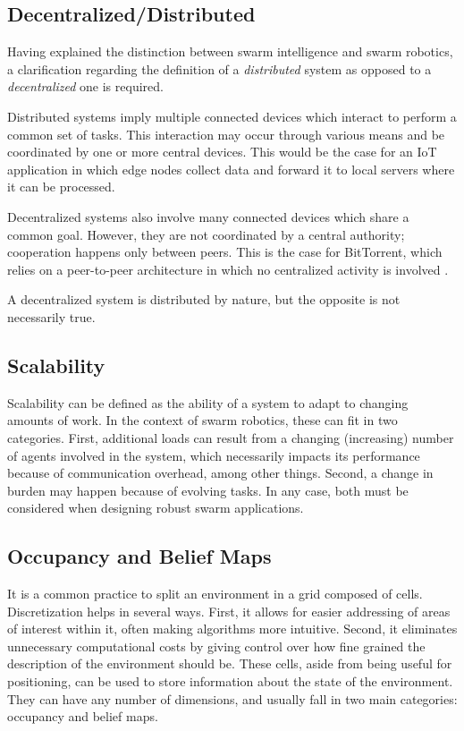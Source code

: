 \subsection{Decentralized/Distributed}
Having explained the distinction between swarm intelligence and swarm robotics, a clarification regarding the definition of a \textit{distributed} system as opposed to a \textit{decentralized} one is required.

Distributed systems imply multiple connected devices which interact to perform a common set of tasks. This interaction may occur through various means and be coordinated by one or more central devices. This would be the case for an \ac{IoT} application in which edge nodes collect data and forward it to local servers where it can be processed.

Decentralized systems also involve many connected devices which share a common goal. However, they are not coordinated by a central authority; cooperation happens only between peers. This is the case for BitTorrent, which relies on a peer-to-peer architecture in which no centralized activity is involved \cite{zhang2010unraveling}.

A decentralized system is distributed by nature, but the opposite is not necessarily true.

\subsection{Scalability}
Scalability can be defined as the ability of a system to adapt to changing amounts of work. In the context of swarm robotics, these can fit in two categories. First, additional loads can result from a changing (increasing) number of agents involved in the system, which necessarily impacts its performance because of communication overhead, among other things. Second, a change in burden may happen because of evolving tasks. In any case, both must be considered when designing robust swarm applications.


\subsection{Occupancy and Belief Maps}
It is a common practice to split an environment in a grid composed of cells. Discretization helps in several ways. First, it allows for easier addressing of areas of interest within it, often making algorithms more intuitive. Second, it eliminates unnecessary computational costs by giving control over how fine grained the description of the environment should be.
These cells, aside from being useful for positioning, can be used to store information about the state of the environment. They can have any number of dimensions, and usually fall in two main categories: occupancy and belief maps.

